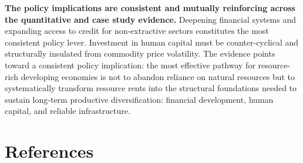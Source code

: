 \documentclass[12pt,a4paper]{report}
\begin{document}
\textbf{The policy implications are consistent and mutually reinforcing across the quantitative and case study evidence.} Deepening financial systems and expanding access to credit for non-extractive sectors constitutes the most consistent policy lever. Investment in human capital must be counter-cyclical and structurally insulated from commodity price volatility. The evidence points toward a consistent policy implication: the most effective pathway for resource-rich developing economies is not to abandon reliance on natural resources but to systematically transform resource rents into the structural foundations needed to sustain long-term productive diversification: financial development, human capital, and reliable infrastructure.


\chapter*{References}
\end{document}
